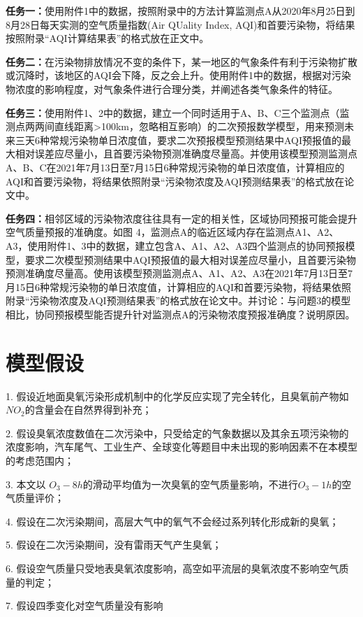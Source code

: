 \documentclass[a4paper,10pt]{my_paper}
\numberwithin{equation}{section}
\begin{document}
\textbf{任务一：}使用附件1中的数据，按照附录中的方法计算监测点A从2020年8月25日到8月28日每天实测的空气质量指数(Air QUality Index, AQI)和首要污染物，将结果按照附录“AQI计算结果表”的格式放在正文中。

\textbf{任务二：}在污染物排放情况不变的条件下，某一地区的气象条件有利于污染物扩散或沉降时，该地区的AQI会下降，反之会上升。使用附件1中的数据，根据对污染物浓度的影响程度，对气象条件进行合理分类，并阐述各类气象条件的特征。

\textbf{任务三：}使用附件1、2中的数据，建立一个同时适用于A、B、C三个监测点（监测点两两间直线距离>100km，忽略相互影响）的二次预报数学模型，用来预测未来三天6种常规污染物单日浓度值，要求二次预报模型预测结果中AQI预报值的最大相对误差应尽量小，且首要污染物预测准确度尽量高。并使用该模型预测监测点A、B、C在2021年7月13日至7月15日6种常规污染物的单日浓度值，计算相应的AQI和首要污染物，将结果依照附录“污染物浓度及AQI预测结果表”的格式放在论文中。

\textbf{任务四：}相邻区域的污染物浓度往往具有一定的相关性，区域协同预报可能会提升空气质量预报的准确度。如图 4，监测点A的临近区域内存在监测点A1、A2、A3，使用附件1、3中的数据，建立包含A、A1、A2、A3四个监测点的协同预报模型，要求二次模型预测结果中AQI预报值的最大相对误差应尽量小，且首要污染物预测准确度尽量高。使用该模型预测监测点A、A1、A2、A3在2021年7月13日至7月15日6种常规污染物的单日浓度值，计算相应的AQI和首要污染物，将结果依照附录“污染物浓度及AQI预测结果表”的格式放在论文中。并讨论：与问题3的模型相比，协同预报模型能否提升针对监测点A的污染物浓度预报准确度？说明原因。
\section{模型假设}
1. 假设近地面臭氧污染形成机制中的化学反应实现了完全转化，且臭氧前产物如${NO_2}$的含量会在自然界得到补充；

2. 假设臭氧浓度数值在二次污染中，只受给定的气象数据以及其余五项污染物的浓度影响，汽车尾气、工业生产、全球变化等题目中未出现的影响因素不在本模型的考虑范围内；

3. 本文以 ${O_3-8h}$的滑动平均值为一次臭氧的空气质量影响，不进行${O_3-1h}$的空气质量评价；

4. 假设在二次污染期间，高层大气中的氧气不会经过系列转化形成新的臭氧；

5. 假设在二次污染期间，没有雷雨天气产生臭氧；

6. 假设空气质量只受地表臭氧浓度影响，高空如平流层的臭氧浓度不影响空气质量的判定；

7. 假设四季变化对空气质量没有影响
\end{document}
